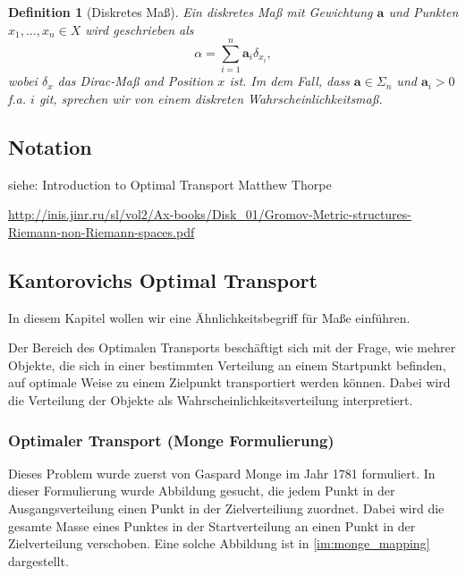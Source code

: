 \documentclass[11pt,a4paper]{article}
\newtheorem{definition}[theorem]{Definition}
\numberwithin{equation}{section}
\begin{document}
	\begin{definition}[Diskretes Maß]
		Ein diskretes Maß mit Gewichtung $\boldsymbol{a}$ und Punkten $x_1,...,x_n \in X$ wird geschrieben als
		\begin{equation}
			\alpha = \sum_{i=1}^n{\boldsymbol{a}_i\delta_{x_i}},
		\end{equation}
		wobei $\delta_x$ das Dirac-Maß and Position $x$ ist. Im dem Fall, dass $\boldsymbol{a} \in \Sigma_n$ und $\boldsymbol{a}_i >0$ f.a. $i$ git, sprechen wir von einem diskreten Wahrscheinlichkeitsmaß.
	\end{definition}
\subsection{Notation}
	siehe: Introduction to Optimal Transport
	Matthew Thorpe
	
	\url{http://inis.jinr.ru/sl/vol2/Ax-books/Disk_01/Gromov-Metric-structures-Riemann-non-Riemann-spaces.pdf}
	\subsection{Kantorovichs Optimal Transport}
	In diesem Kapitel wollen wir eine Ähnlichkeitsbegriff für Maße einführen.
	
	Der Bereich des Optimalen Transports beschäftigt sich mit der Frage, wie mehrer Objekte, die sich in einer bestimmten Verteilung an einem Startpunkt befinden, auf optimale Weise zu einem Zielpunkt transportiert werden können. Dabei wird die Verteilung der Objekte als Wahrscheinlichkeitsverteilung interpretiert. 
	
	
	\subsubsection{Optimaler Transport (Monge Formulierung)}
	
	Dieses Problem wurde zuerst von Gaspard Monge im Jahr 1781 formuliert. In dieser Formulierung wurde Abbildung gesucht, die jedem Punkt in der Ausgangsverteilung einen Punkt in der Zielverteiliung zuordnet. Dabei wird die gesamte Masse eines Punktes in der Startverteilung an einen Punkt in der Zielverteilung verschoben. Eine solche Abbildung ist in \autoref{im:monge_mapping} dargestellt.
	
\end{document}
